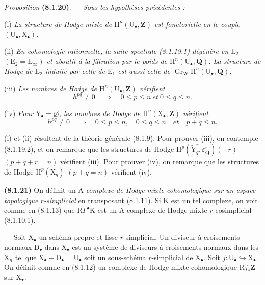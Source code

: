 \documentclass[11pt,leqno]{article}
\newcommand{\Page}[1]{\ifvmode\noindent\else\unskip\ \fi{\footnotesize\textcolor{gray}{[p.\,#1]}}\ \ignorespaces}
\begin{document}
\textit{Proposition} \textbf{(8.1.20)}. — \textit{Sous les hypothèses précédentes :}

(i) \textit{La structure de Hodge mixte de \(\mathrm{H}^{n}(\mathrm{U}_{\bullet},\mathbf{Z})\) est fonctorielle en le couple \((\mathrm{U}_{\bullet},\mathrm{X}_{\bullet})\).}

(ii) \textit{En cohomologie rationnelle, la suite spectrale (8.1.19.1) dégénère en \(\mathrm{E}_{2}\) \((\mathrm{E}_{2}=\mathrm{E}_{\infty})\) et aboutit à la filtration par le poids de \(\mathrm{H}^{n}(\mathrm{U}_{\bullet},\mathbf{Q})\). La structure de Hodge de \(\mathrm{E}_{2}\) induite par celle de \(\mathrm{E}_{1}\) est aussi celle de \(\operatorname{Gr}_{\mathrm{W}}\mathrm{H}^{n}(\mathrm{U}_{\bullet},\mathbf{Q})\).}

(iii) \textit{Les nombres de Hodge de \(\mathrm{H}^{n}(\mathrm{U}_{\bullet},\mathbf{Z})\) vérifient}
\[
h^{pq}\neq0
\quad\Rightarrow\quad
0\leq p\leq n\ \textit{et}\ 0\leq q\leq n.
\]

(iv) \textit{Pour \(\mathrm{Y}_{\bullet}=\varnothing\), les nombres de Hodge de \(\mathrm{H}^{n}(\mathrm{X}_{\bullet},\mathbf{Z})\) vérifient}
\[
h^{pq}\neq0
\quad\Rightarrow\quad
0\leq p\leq n,\quad 0\leq q\leq n
\quad\textit{et}\quad p+q\leq n.
\]

(i) et (ii) résultent de la théorie générale (8.1.9). Pour prouver (iii), on contemple (8.1.19.2), et on remarque que les structures de Hodge \(\mathrm{H}^{p}(\widetilde{\mathrm{Y}}_{q}^{r},\varepsilon_{\mathbf{Q}}^{r})(-r)\) \((p+q+r=n)\) vérifient (iii). Pour prouver (iv), on remarque que les structures de Hodge \(\mathrm{H}^{p}(\mathrm{X}_{q})\) \((p+q=n)\) vérifient (iv).

\textbf{(8.1.21)} On définit un \(\mathrm{A}\)-\textit{complexe de Hodge mixte cohomologique sur un espace topologique \(r\)-simplicial} en transposant (8.1.11). Si \(\mathrm{K}\) est un tel complexe, on voit comme en (8.1.13) que \(\mathrm{R}\Gamma^\bullet\mathrm{K}\) est un \(\mathrm{A}\)-complexe de Hodge mixte \(r\)-cosimplicial (8.1.10.1).

\Page{36}
Soit \(\mathrm{X}_{\bullet}\) un schéma propre et lisse \(r\)-simplicial. Un diviseur à croisements normaux \(\mathrm{D}_{\bullet}\) dans \(\mathrm{X}_{\bullet}\) est un système de diviseurs à croisements normaux dans les \(\mathrm{X}_{n}\) tel que \(\mathrm{X}_{\bullet}-\mathrm{D}_{\bullet}=\mathrm{U}_{\bullet}\) soit un sous-schéma \(r\)-simplicial de \(\mathrm{X}_{\bullet}\). Soit \(j:\mathrm{U}_{\bullet}\hookrightarrow\mathrm{X}_{\bullet}\). On définit comme en (8.1.12) un complexe de Hodge mixte cohomologique \(\mathrm{R}j_{\ast}\mathbf{Z}\) sur \(\mathrm{X}_{\bullet}\).
\end{document}
